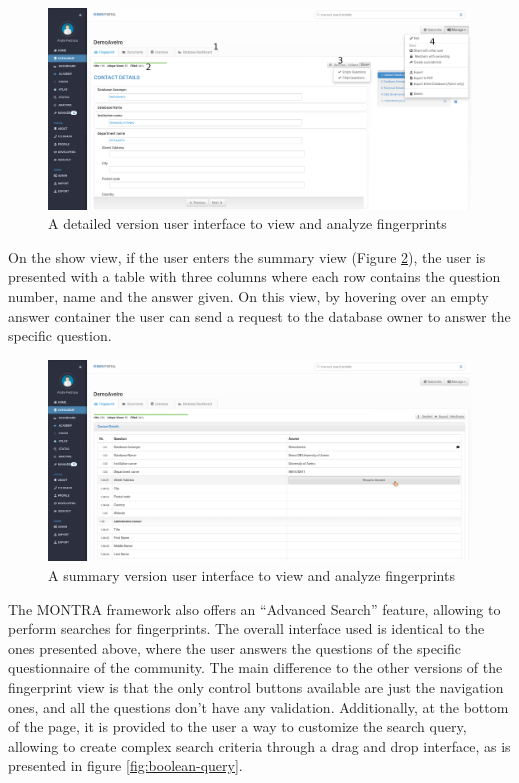 \begin{figure}
    \center
    \includegraphics[width=\textwidth]{fingerprint-show-detailed}
    \caption{A detailed version user interface to view and analyze fingerprints}
    \label{fig:fingerprint-show-detailed}
\end{figure}

On the show view, if the user enters the summary view (Figure \ref{fig:fingerprint-show-summary}), the user is presented with a table with three columns where each row contains the question number, name and the answer given.
On this view, by hovering over an empty answer container the user can send a request to the database owner to answer the specific question.

\begin{figure}
    \center
    \includegraphics[width=\textwidth]{fingerprint-show-summary}
    \caption{A summary version user interface to view and analyze fingerprints}
    \label{fig:fingerprint-show-summary}
\end{figure}

The MONTRA framework also offers an ``Advanced Search'' feature, allowing to perform searches for fingerprints.
The overall interface used is identical to the ones presented above, where the user answers the questions of the specific questionnaire of the community.
The main difference to the other versions of the fingerprint view is that the only control buttons available are just the navigation ones, and all the questions don't have any validation.
Additionally, at the bottom of the page, it is provided to the user a way to customize the search query, allowing to create complex search criteria through a drag and drop interface, as is presented in figure \ref{fig:boolean-query}.

